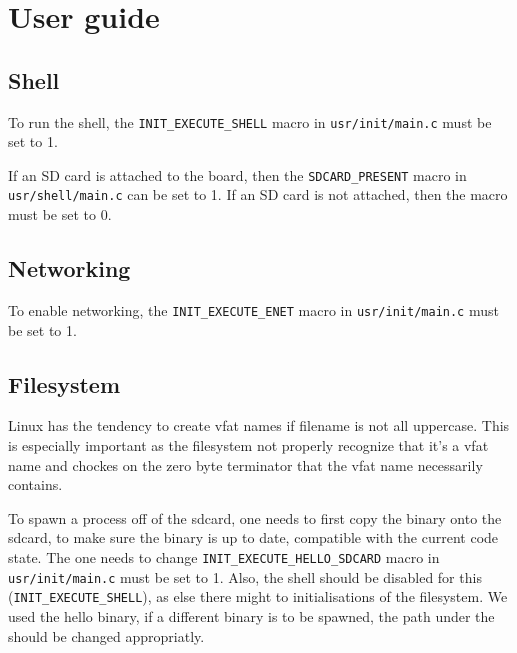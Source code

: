 \chapter{User guide}

\section{Shell}

To run the shell, the \verb|INIT_EXECUTE_SHELL| macro in \verb|usr/init/main.c| must be set to 1.

If an SD card is attached to the board, then the \verb|SDCARD_PRESENT| macro in \verb|usr/shell/main.c| can be set to 1.
If an SD card is not attached, then the macro must be set to 0.

\section{Networking}

To enable networking, the \verb|INIT_EXECUTE_ENET| macro in \verb|usr/init/main.c| must be set to 1.

\section{Filesystem}

Linux has the tendency to create vfat names if filename is not all uppercase.
This is especially important as the filesystem not properly recognize that it's
a vfat name and chockes on the zero byte terminator that the vfat name
necessarily contains.

To spawn a process off of the sdcard, one needs to first copy the binary onto
the sdcard, to make sure the binary is up to date, compatible with the current
code state.
The one needs to change \verb|INIT_EXECUTE_HELLO_SDCARD| macro in
\verb|usr/init/main.c| must be set to 1.
Also, the shell should be disabled for this (\verb|INIT_EXECUTE_SHELL|), as else
there might to initialisations of the filesystem.
We used the hello binary, if a different binary is to be spawned, the path
under the should be changed appropriatly.
